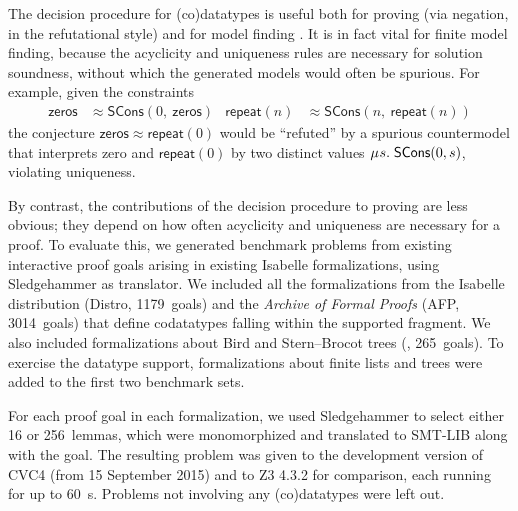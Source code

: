 \documentclass[letter]{article}
\newcommand\MU{\vvthinspace\mu\vvthinspace}
\theoremstyle{plain}
\theoremstyle{definition}
\newcommand\const[1]{\textsf{#1}}
\newcommand{\teq}{\approx}
\newcommand\vvthinspace{\kern+0.041667em}
\begin{document}
The decision procedure for (co)datatypes is useful both for proving (via
negation, in the refutational style) and for model finding
\cite{ge-de-moura-2009,reynolds-et-al-2013}.
It is in fact vital for finite model finding,
because the acyclicity and uniqueness rules are necessary for solution
soundness, without which the generated models would often be
spurious. For example, given the constraints
\begin{align*}
\const{zeros} & \teq \const{SCons}(0,\:\const{zeros})
& \const{repeat}(n) & \teq \const{SCons}(n,\:\const{repeat}(n))
\end{align*}
the conjecture
$\const{zeros} \teq \const{repeat}(0)$
would be ``refuted'' by a spurious countermodel that interprets
\const{zero} and $\const{repeat}(0)$ by two distinct
values $\MU s.\; \const{SCons}(0, s)$,
violating uniqueness.

By contrast, the contributions of the decision procedure
to proving are less obvious; they depend on how
often acyclicity and uniqueness are necessary for a proof.
To evaluate this,
we generated benchmark problems from existing interactive
proof goals arising in existing
Isabelle formalizations, using Sledgehammer \cite{blanchette-et-al-2013-smt}
as translator.
We
included all the formalizations from the Isabelle distribution (Distro, 1179~goals)
and the \emph{Archive of Formal Proofs} (AFP, 3014~goals) that define codatatypes falling within the supported fragment. We
also included formalizations about Bird and Stern--Brocot trees (\gandl,
265~goals). %
To exercise the datatype support, formalizations about finite
lists and trees
were added to the first two benchmark sets.



For each proof goal in each formalization, we used Sledgehammer to select either 16 or
256~lemmas, which were monomorphized and translated to SMT-LIB along with the
goal. The resulting problem was given to the
development version of CVC4
(from 15 September 2015) and to
Z3 4.3.2 for comparison, each running for
up to 60~s. %
Problems not involving any (co)datatypes were left out.
\end{document}
